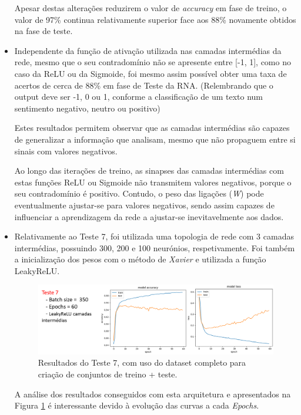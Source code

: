 \begin{itemize}
    Apesar destas alterações reduzirem o valor de \textit{accuracy} em fase de treino, o valor de 97\% continua relativamente superior face aos 88\% novamente obtidos na fase de teste. 
    
    \item Independente da função de ativação utilizada nas camadas intermédias da rede, mesmo que o seu contradomínio não se apresente entre [-1, 1], como no caso da ReLU ou da Sigmoide, foi mesmo assim possível obter uma taxa de acertos de cerca de 88\% em fase de Teste da RNA. 
    (Relembrando que o output deve ser -1, 0 ou 1, conforme a classificação de um texto num sentimento negativo, neutro ou positivo) 
    
    Estes resultados permitem observar que as camadas intermédias são capazes de generalizar a informação que analisam, mesmo que não propaguem entre si sinais com valores negativos. 
    
    Ao longo das iterações de treino, as sinapses das camadas intermédias com estas funções ReLU ou Sigmoide não transmitem valores negativos, porque o seu contradomínio é positivo. Contudo, o peso das ligações (\textit{W}) pode eventualmente ajustar-se para valores negativos, sendo assim capazes de influenciar a aprendizagem da rede a ajustar-se inevitavelmente aos dados. 
    
    \item Relativamente ao Teste 7, foi utilizada uma topologia de rede com 3 camadas intermédias, possuindo 300, 200 e 100 neurónios, respetivamente. 
    Foi também a inicialização dos pesos com o método de \textit{Xavier} e utilizada a função LeakyReLU.  
    
    \begin{figure}[H]
        \hspace{-0.4in}
        \includegraphics[scale=0.65]{Imagens/t7.png}
        \caption{Resultados do Teste 7, com uso do dataset completo para criação de conjuntos de treino + teste.}
        \label{fig:teste4}
    \end{figure}
    
    A análise dos resultados conseguidos com esta arquitetura e apresentados na Figura \ref{fig:teste4} é interessante devido à evolução das curvas a cada \textit{Epochs}. 
    

\end{itemize}
